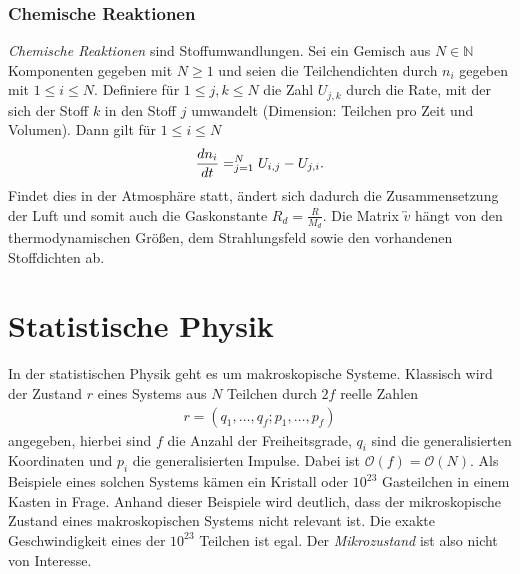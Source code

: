 \documentclass{book}
\let\sum\relax
\DeclareMathOperator*{\sum}{\raisebox{-3.5pt}{\scalebox{2}{\rotatebox{1}{{\bask Σ}}}}}
\begin{document}
\subsubsection{Chemische Reaktionen}
\label{sec:chemische_reaktionen}

\textit{Chemische Reaktionen} sind Stoffumwandlungen. Sei ein Gemisch aus $N\in\mathbb{N}$ Komponenten gegeben mit $N\geq1$ und seien die Teilchendichten durch $n_i$ gegeben mit $1\leq i\leq N$. Definiere für $1\leq j, k\leq N$ die Zahl $U_{j, k}$ durch die Rate, mit der sich der Stoff $k$ in den Stoff $j$ umwandelt (Dimension: Teilchen pro Zeit und Volumen). Dann gilt für $1\leq i\leq N$ 
%
\begin{eqnarray}
\frac{dn_i}{dt} = \sum_{j = 1}^{N}U_{i, j} - U_{j, i}.
\end{eqnarray}
%
Findet dies in der Atmosphäre statt, ändert sich dadurch die Zusammensetzung der Luft und somit auch die Gaskonstante $R_d=\frac{R}{M_d}$. Die Matrix $\overleftrightarrow{v}$ hängt von den thermodynamischen Größen, dem Strahlungsfeld sowie den vorhandenen Stoffdichten ab.

\section{Statistische Physik}
\label{sec:statistische_physik}

In der statistischen Physik geht es um makroskopische Systeme. Klassisch wird der Zustand $r$ eines Systems aus $N$ Teilchen durch $2f$ reelle Zahlen
%
\begin{eqnarray}
r = \left(q_1, \dotsc, q_f;p_1, \dotsc, p_f\right)
\end{eqnarray}
%
angegeben, hierbei sind $f$ die Anzahl der Freiheitsgrade, $q_i$ sind die generalisierten Koordinaten und $p_i$ die generalisierten Impulse. Dabei ist $\mathcal{O}\left(f\right) = \mathcal{O}\left(N\right)$. Als Beispiele eines solchen Systems kämen ein Kristall oder $10^{23}$ Gasteilchen in einem Kasten in Frage. Anhand dieser Beispiele wird deutlich, dass der mikroskopische Zustand eines makroskopischen Systems nicht relevant ist. Die exakte Geschwindigkeit eines der $10^{23}$ Teilchen ist egal. Der \textit{Mikrozustand} ist also nicht von Interesse.
\end{document}
